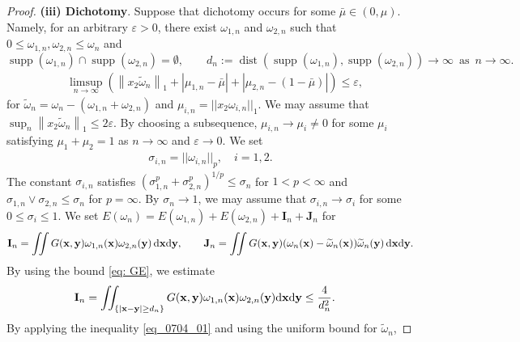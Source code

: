 \documentclass[11pt]{amsart}
\theoremstyle{definition}
\theoremstyle{definition}
\numberwithin{equation}{section}
\newcommand{\tld}[1]{\widetilde{#1}}
\newcommand{\0}{\emptyset}
\newcommand{\omg}{\omega}
\newcommand{\bfx}{{\bf x}}
\newcommand{\bfy}{{\bf y}}
\newcommand{\bfI}{{\bf I}}
\newcommand{\bfJ}{{\bf J}}
\newcommand{\dd}{\mathrm{d}}
\begin{document}
\begin{proof}
				\noindent
				\textbf{(iii) Dichotomy}.
				Suppose that dichotomy occurs for some $\bar{\mu} \in (0, \mu)$. Namely, for an arbitrary $\varepsilon > 0$, there exist $\omega_{1, n}$ and $\omega_{2, n}$ such that $0\leq \omega_{1,n}, \omega_{2,n}\leq \omega_n$ and 
				\[
				\operatorname{supp} (\omega_{1,n}) \cap \operatorname{supp} (\omega_{2,n}) = \emptyset, \qquad d_n  :=  \operatorname{dist} \left( \operatorname{supp} (\omega_{1,n}), \operatorname{supp} (\omega_{2,n}) \right) \to \infty \, \mbox{ as }\, n\to\infty.
				\]
				\begin{align*}
					&\limsup_{n \to \infty} \left(\left\| x_2\tld\omega_{n} \right\|_1 + \left| \mu_{1,n} - \bar{\mu} \right| + \left| \mu_{2,n} - (1 - \bar{\mu}) \right| \right)  \leq  \varepsilon,
				\end{align*} 
				for $\tld{\omg}_{n}=\omg_n - (\omg_{1,n}+\omg_{2,n})$ and $\mu_{i,n} =||x_2 \omega_{i,n}||_{1}$. We may assume that $\sup_{n}\left\| x_2\tld\omega_{n} \right\|_1\leq 2\varepsilon$. By choosing a subsequence, $\mu_{i,n}\to \mu_{i}\neq 0$ for some $\mu_{i}$ satisfying $\mu_1+\mu_2=1$ as $n\to\infty$ and $\varepsilon\to 0$. We set
				\begin{align*}\label{eq_disjoint}
					\sigma_{i,n}=||\omega_{i,n}||_{p},\quad i=1,2.
				\end{align*} 
				The constant $\sigma_{i,n}$ satisfies $(\sigma_{1,n}^{p}+\sigma_{2,n}^{p})^{1/p}\leq \sigma_{n}$ for $1<p<\infty$ and $\sigma_{1,n}\vee \sigma_{2,n}\leq \sigma_{n}$ for $p=\infty$. By $\sigma_n\to1$, we may assume that $\sigma_{i,n}\to \sigma_i$ for some $0\leq \sigma_i\leq 1$. We set $E(\omega_n) = E(\omega_{1, n}) + E(\omega_{2, n}) + \mathbf{I}_{n} + \mathbf{J}_{n}$ for
				\begin{equation*}
					\begin{split}
						\bfI_n = \iint G(\bfx,\bfy) \omega_{1,n}(\bfx)\omega_{2,n}(\bfy) \, \dd \bfx\dd \bfy, \qquad \bfJ_n= \iint G(\bfx,\bfy) (\omega_{n}(\bfx) - \tld{\omg}_{n}(\bfx))  \tld{\omg}_{n}(\bfy) \, \dd \bfx\dd \bfy .
					\end{split}
				\end{equation*}
				By using the bound \eqref{eq: GE}, we estimate 
				\begin{align*}
					\mathbf{I}_{n}  &=  \iint_{\{|\bfx - \bfy|\geq d_n\}} G(\bfx, \bfy)\omega_{1,n}(\bfx)\omega_{2,n}(\bfy)  \dd \bfx\dd \bfy \le  \frac{4}{ d_n^{2}}.
				\end{align*}
				By applying the inequality \eqref{eq_0704_01} and using the uniform bound for $\tld{\omg}_{n}$, 

\end{proof}
\end{document}

